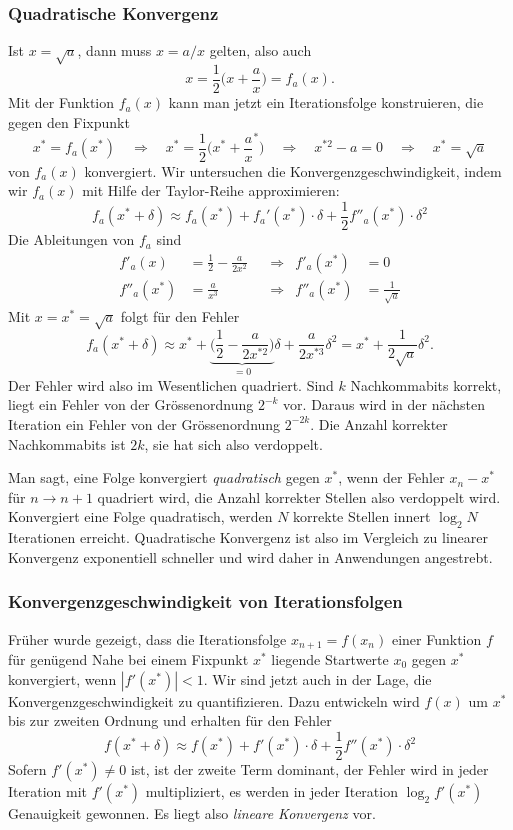 \subsubsection{Quadratische Konvergenz}
Ist $x=\sqrt{a}$, dann muss $x = a/x$ gelten, also auch
\[
x = \frac12\biggl(x+\frac{a}x\biggr) = f_a(x).
\]
Mit der Funktion $f_a(x)$ kann man jetzt ein Iterationsfolge konstruieren,
die gegen den Fixpunkt 
\[
x^*=f_a(x^*)
\quad\Rightarrow\quad
x^*=\frac12\biggl(x^*+\frac{a}x^*\biggr)
\quad\Rightarrow\quad
x^{*2}-a=0
\quad\Rightarrow\quad
x^*=\sqrt{a}
\]
von $f_a(x)$ konvergiert.
Wir untersuchen die Konvergenzgeschwindigkeit, indem wir $f_a(x)$
mit Hilfe der Taylor-Reihe approximieren:
\[
f_a(x^*+\delta)
\approx
f_a(x^*) + f_a'(x^*)\cdot\delta + \frac12f''_a(x^*)\cdot\delta^2
\]
Die Ableitungen von $f_a$ sind
\begin{align*}
f'_a(x)
&=
\frac12 -\frac{a}{2x^2}
&&\Rightarrow&
f'_a(x^*)&=0
\\
f''_a(x^*)
&=
\frac{a}{x^3}
&&\Rightarrow&
f''_a(x^*)&=\frac{1}{\!\sqrt{a}}
\end{align*}
Mit $x=x^* =\sqrt{a}$ folgt für den Fehler
\[
f_a(x^*+\delta)
\approx
x^* + \underbrace{\biggl(\frac12-\frac{a}{2x^{*2}}\biggr)}_{\displaystyle=0}\delta
+
\frac{a}{2x^{*3}}\delta^2
=
x^* + \frac{1}{2\sqrt{a}}\delta^2.
\]
Der Fehler wird also im Wesentlichen quadriert.
Sind $k$ Nachkommabits korrekt, liegt ein Fehler von der Grössenordnung
$2^{-k}$ vor. 
Daraus wird in der nächsten Iteration ein Fehler von der Grössenordnung
$2^{-2k}$.
Die Anzahl korrekter Nachkommabits ist $2k$, sie hat sich also
verdoppelt.

Man sagt, eine Folge konvergiert {\em quadratisch} gegen $x^*$,
wenn der Fehler $x_n-x^*$ für $n\to n+1$ quadriert wird, die Anzahl
korrekter Stellen also verdoppelt wird.
Konvergiert eine Folge quadratisch, werden $N$ korrekte Stellen
innert $\log_2N$ Iterationen erreicht.
Quadratische Konvergenz ist also im Vergleich zu linearer Konvergenz
exponentiell schneller und wird daher in Anwendungen angestrebt.

\subsubsection{Konvergenzgeschwindigkeit von Iterationsfolgen}

Früher wurde gezeigt, dass die Iterationsfolge $x_{n+1}=f(x_n)$ einer
Funktion $f$ für genügend Nahe bei einem Fixpunkt $x^*$ liegende
Startwerte $x_0$ gegen $x^*$ konvergiert, wenn $|f'(x^*)| < 1$.
Wir sind jetzt auch in der Lage, die Konvergenzgeschwindigkeit
zu quantifizieren.
Dazu entwickeln wird $f(x)$ um $x^*$ bis zur zweiten Ordnung und
erhalten für den Fehler
\begin{equation}
f(x^*+\delta)
\approx
f(x^*) + f'(x^*) \cdot \delta + \frac12f''(x^*)\cdot \delta^2
\label{buch:equation:iterkonv}
\end{equation}
Sofern $f'(x^*)\ne 0$ ist, ist der zweite Term dominant, der Fehler
wird in jeder Iteration mit $f'(x^*)$ multipliziert, es werden in
jeder Iteration $\log_2 f'(x^*)$ Genauigkeit gewonnen.
Es liegt also {\em lineare Konvergenz} vor.
%
%

